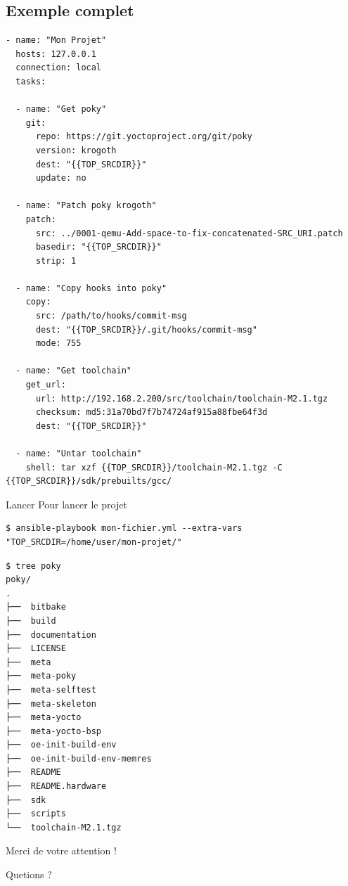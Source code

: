 \documentclass[compress]{smilebeamer}
\begin{document}
\subsection{Exemple complet}
\begin{frame}[fragile]
\begin{lstlisting}[style=bitbake,basicstyle=\tiny\ttfamily\color{white}]
- name: "Mon Projet"
  hosts: 127.0.0.1
  connection: local
  tasks:

  - name: "Get poky"
    git:
      repo: https://git.yoctoproject.org/git/poky
      version: krogoth
      dest: "{{TOP_SRCDIR}}"
      update: no

  - name: "Patch poky krogoth"
    patch:
      src: ../0001-qemu-Add-space-to-fix-concatenated-SRC_URI.patch
      basedir: "{{TOP_SRCDIR}}"
      strip: 1

  - name: "Copy hooks into poky"
    copy:
      src: /path/to/hooks/commit-msg
      dest: "{{TOP_SRCDIR}}/.git/hooks/commit-msg"
      mode: 755

  - name: "Get toolchain"
    get_url:
      url: http://192.168.2.200/src/toolchain/toolchain-M2.1.tgz
      checksum: md5:31a70bd7f7b74724af915a88fbe64f3d
      dest: "{{TOP_SRCDIR}}"

  - name: "Untar toolchain"
    shell: tar xzf {{TOP_SRCDIR}}/toolchain-M2.1.tgz -C {{TOP_SRCDIR}}/sdk/prebuilts/gcc/
\end{lstlisting}
\end{frame}

\begin{frame}[fragile]{Lancer}
Pour lancer le projet
\begin{lstlisting}[style=shell]
$ ansible-playbook mon-fichier.yml --extra-vars "TOP_SRCDIR=/home/user/mon-projet/"
\end{lstlisting}

\begin{lstlisting}[style=shell,basicstyle=\tiny\ttfamily\color{white}]
$ tree poky
poky/
.
├──  bitbake
├──  build
├──  documentation
├──  LICENSE
├──  meta
├──  meta-poky
├──  meta-selftest
├──  meta-skeleton
├──  meta-yocto
├──  meta-yocto-bsp
├──  oe-init-build-env
├──  oe-init-build-env-memres
├──  README
├──  README.hardware
├──  sdk
├──  scripts
└──  toolchain-M2.1.tgz
\end{lstlisting}
\end{frame}




\begin{frame}
\begin{center}
\huge{Merci de votre attention !}
\end{center}
\begin{center}
Quetions ?
\end{center}
\end{frame}
\end{document}
